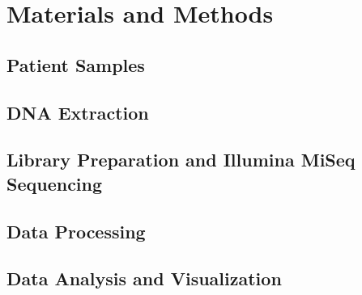 
\chapter{Materials and Methods}
\label{ch:Materialsandmethods}

\section{Patient Samples}
\label{sec:PatientSamples}


\section{DNA Extraction}
\label{sec:DNAExtraction}


\section{Library Preparation and Illumina MiSeq Sequencing}
\label{sec:LibraryPreparationandIlluminaMiSeqSequencing}


\section{Data Processing}
\label{sec:DataProcessing}


\section{Data Analysis and Visualization}
\label{sec:DataAnalysisandVisualization}



\endinput
\section{Introduction}
\label{sec:Introduction}

Genomics-driven oncology is an emerging approach that aims to use genomic information for patient management and therapeutic intervention in oncologic care. Using MPS technologies, cancer biomarkers with diagnostic, prognostic, predictive, and pharmacogenomic (PGx) significance can be screened at a reduced cost and turn-around time to inform medical decision-making. PGx markers are germline genetic

